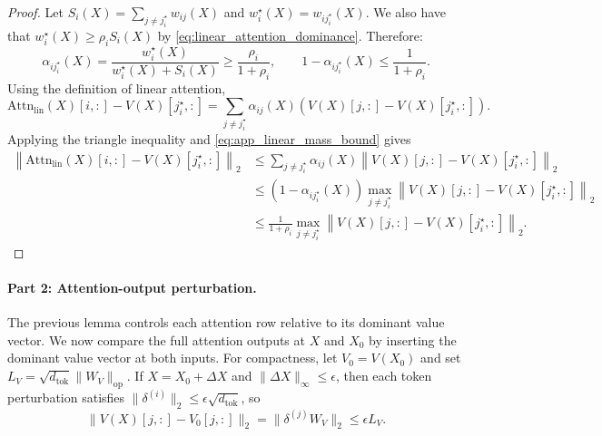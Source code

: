 \documentclass{article}
\theoremstyle{definition}
\begin{document}
\begin{proof}
Let $S_i(X)=\sum\limits_{j\neq j_i^\star}w_{ij}(X)$ and $w_i^\star(X)=w_{i j_i^\star}(X)$. We also have that $w_i^\star(X)\geq \rho_i S_i(X)$ by \eqref{eq:linear_attention_dominance}. Therefore:
\begin{equation}
    \alpha_{i j_i^\star}(X)
    =
    \frac{w_i^\star(X)}{w_i^\star(X)+S_i(X)}
    \geq
    \frac{\rho_i}{1+\rho_i},
    \qquad
    1-\alpha_{i j_i^\star}(X)
    \leq
    \frac{1}{1+\rho_i}.
    \label{eq:app_linear_mass_bound}
\end{equation}
Using the definition of linear attention,
\begin{equation}
    \mathrm{Attn}_{\mathrm{lin}}(X)[i,:]-V(X)[j_i^\star,:]
    =
    \sum_{j\neq j_i^\star}
    \alpha_{ij}(X)
    \left(
        V(X)[j,:]-V(X)[j_i^\star,:]
    \right).
    \label{eq:app_linear_deviation_identity}
\end{equation}
Applying the triangle inequality and \eqref{eq:app_linear_mass_bound} gives
\begin{equation}
\begin{aligned}
    \left\|
    \mathrm{Attn}_{\mathrm{lin}}(X)[i,:]-V(X)[j_i^\star,:]
    \right\|_2
    &\leq
    \sum_{j\neq j_i^\star}
    \alpha_{ij}(X)
    \left\|
    V(X)[j,:]-V(X)[j_i^\star,:]
    \right\|_2 \\
    &\leq
    \left(1-\alpha_{i j_i^\star}(X)\right)
    \max_{j\neq j_i^\star}
    \left\|
    V(X)[j,:]-V(X)[j_i^\star,:]
    \right\|_2 \\
    &\leq
    \frac{1}{1+\rho_i}
    \max_{j\neq j_i^\star}
    \left\|
    V(X)[j,:]-V(X)[j_i^\star,:]
    \right\|_2.
\end{aligned}
\end{equation}
\end{proof}

\paragraph{Part 2: Attention-output perturbation.}
The previous lemma controls each attention row relative to its dominant value vector. We now compare the full attention outputs at $X$ and $X_0$ by inserting the dominant value vector at both inputs. For compactness, let $V_0=V(X_0)$ and set $L_V=\sqrt{d_{\mathrm{tok}}}\|W_V\|_{\mathrm{op}}$. If $X=X_0+\Delta X$ and $\|\Delta X\|_\infty\leq\epsilon$, then each token perturbation satisfies $\|\delta^{(i)}\|_2\leq\epsilon\sqrt{d_{\mathrm{tok}}}$, so
\begin{equation}
    \|V(X)[j,:]-V_0[j,:]\|_2
    =
    \|\delta^{(j)}W_V\|_2
    \leq
    \epsilon L_V.
    \label{eq:app_value_drift}
\end{equation}
\end{document}
